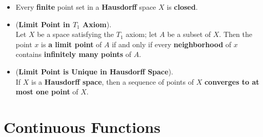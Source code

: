 \documentclass[11pt]{article}
\begin{document}
\begin{itemize}
\item \begin{proposition}
Every \textbf{finite} point set in a \textbf{Hausdorff} space $X$ is \textbf{closed}.
\end{proposition}

\item \begin{proposition} (\textbf{Limit Point in $T_1$ Axiom}). \citep{munkres2000topology} \\
Let $X$ be a space satisfying the $T_1$ axiom; let $A$ be a subset of $X$. Then the point $x$ is \textbf{a limit point} of $A$ if and only if every \textbf{neighborhood} of $x$ contains \textbf{infinitely many points} of $A$.
\end{proposition}

\item \begin{proposition} (\textbf{Limit Point is Unique in Hausdorff Space}). \citep{munkres2000topology} \\
If $X$ is a \textbf{Hausdorff space}, then a sequence of points of $X$ \textbf{converges to at most one point} of $X$.
\end{proposition}
\end{itemize}

\section{Continuous Functions}
\end{document}
